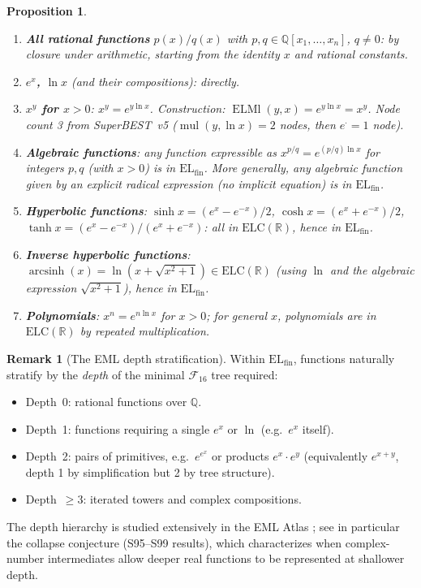 \documentclass[12pt,a4paper]{article}
\newtheorem{proposition}[theorem]{Proposition}
\theoremstyle{definition}
\newtheorem{remark}[theorem]{Remark}
\newcommand{\ELMl}{\operatorname{ELMl}}
\newcommand{\F}{\mathcal{F}_{16}}
\newcommand{\ELfin}{\mathrm{EL}_{\mathrm{fin}}}
\newcommand{\ELC}{\mathrm{ELC}(\mathbb{R})}
\newcommand{\Q}{\mathbb{Q}}
\newcommand{\mulop}{\operatorname{mul}}
\begin{document}
\begin{proposition}
\label{prop:positive}
\begin{enumerate}
  \item \textbf{All rational functions} $p(x)/q(x)$ with $p,q\in\Q[x_1,\ldots,
        x_n]$, $q\neq 0$: by closure under arithmetic, starting from the
        identity $x$ and rational constants.
  \item \textbf{$e^x$, $\ln x$} (and their compositions): directly.
  \item \textbf{$x^y$ for $x>0$}: $x^y = e^{y\ln x}$.  Construction:
        $\ELMl(y,x)=e^{y\ln x}=x^y$.  Node count 3 from
        SuperBEST~v5 \cite{SB5} ($\mulop(y,\ln x)=2$ nodes, then $e^{\cdot}=1$
        node).
  \item \textbf{Algebraic functions}: any function expressible as
        $x^{p/q}=e^{(p/q)\ln x}$ for integers $p,q$ (with $x>0$) is in
        $\ELfin$.  More generally, any algebraic function given by an explicit
        radical expression (no implicit equation) is in $\ELfin$.
  \item \textbf{Hyperbolic functions}:
        $\sinh x = (e^x-e^{-x})/2$, $\cosh x = (e^x+e^{-x})/2$,
        $\tanh x = (e^x-e^{-x})/(e^x+e^{-x})$: all in $\ELC$, hence in $\ELfin$.
  \item \textbf{Inverse hyperbolic functions}:
        $\operatorname{arcsinh}(x)=\ln(x+\sqrt{x^2+1})\in\ELC$ (using $\ln$
        and the algebraic expression $\sqrt{x^2+1}$), hence in $\ELfin$.
  \item \textbf{Polynomials}: $x^n = e^{n\ln x}$ for $x>0$; for general $x$,
        polynomials are in $\ELC$ by repeated multiplication.
\end{enumerate}
\end{proposition}

\begin{remark}[The EML depth stratification]
Within $\ELfin$, functions naturally stratify by the \emph{depth} of the
minimal $\F$ tree required:
\begin{itemize}
  \item Depth~0: rational functions over $\Q$.
  \item Depth~1: functions requiring a single $e^x$ or $\ln$
        (e.g.\ $e^x$ itself).
  \item Depth~2: pairs of primitives, e.g.\ $e^{e^x}$ or products $e^x\cdot e^y$
        (equivalently $e^{x+y}$, depth 1 by simplification but 2 by tree
        structure).
  \item Depth~$\ge 3$: iterated towers and complex compositions.
\end{itemize}
The depth hierarchy is studied extensively in the EML Atlas \cite{EMLAtlas};
see in particular the collapse conjecture (S95--S99 results), which characterizes
when complex-number intermediates allow deeper real functions to be represented at
shallower depth.
\end{remark}
\end{document}

